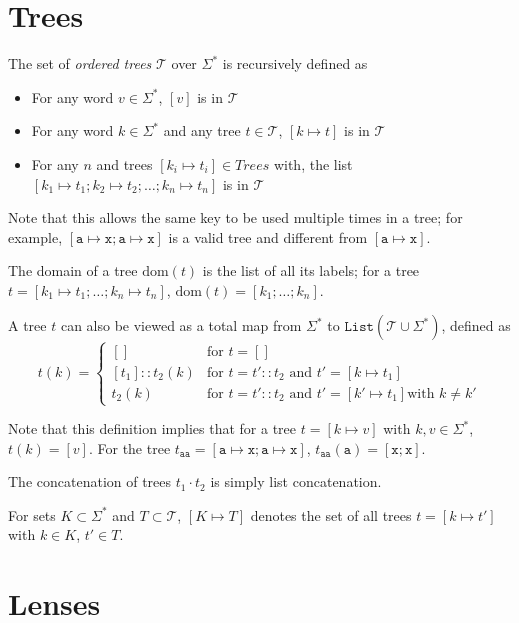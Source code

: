 \documentclass{amsart}
\newcommand{\ensmath}[1]{\ensuremath{#1}\xspace}
\newcommand{\tree}[1]{\ensmath{[#1]}}
\newcommand{\conc}[2]{\ensmath{#1\cdot #2}}
\newcommand{\Trees}{\ensmath{\mathcal T}}
\newcommand{\Words}{\ensmath{\Sigma^*}}
\newcommand{\tmap}[2]{\ensmath{#1\mapsto #2}}
\newcommand{\tmaptt}[2]{\ensmath{{\mathtt #1}\mapsto {\mathtt #2}}}
\newcommand{\dom}[1]{\ensmath{\mathrm{dom}(#1)}}
\newcommand{\List}{\ensmath{\mathtt{List}}}
\begin{document}
\section{Trees}
The set of \emph{ordered trees} \Trees over $\Words$ is recursively 
defined as
\begin{itemize}
\item For any word $v\in\Words$, $\tree{v}$ is in \Trees
\item For any word $k\in\Words$ and any tree $t\in\Trees$,
  $\tree{\tmap{k}{t}}$ is in \Trees
\item For any $n$ and trees $\tree{\tmap{k_i}{t_i}} \in Trees$ with, the
  list $[\tmap{k_1}{t_1};\tmap{k_2}{t_2};\ldots;\tmap{k_n}{t_n}]$ is in
  \Trees
\end{itemize}

Note that this allows the same key to be used multiple times in a tree; for
example, $[\tmaptt{a}{x}; \tmaptt{a}{x}]$ is a valid tree and
different from $[\tmaptt{a}{x}]$.

The domain of a tree $\dom{t}$ is the list of all its labels; for a tree $t
= \tree{\tmap{k_1}{t_1};\ldots;\tmap{k_n}{t_n}}$, $\dom{t} =
[k_1;\ldots;k_n].$

A tree $t$ can also be viewed as a total map from \Words to $\List(\Trees\cup\Words)$,
defined as
\begin{equation*}
  t(k) = 
  \begin{cases}
    [] & \text{for } t = []\\
    [t_1] :: t_2(k) & \text{for } t = t' :: t_2 
                      \text{ and } t' = \tree{\tmap{k}{t_1}}\\
    t_2(k) & \text{for } t = t' :: t_2 
             \text{ and } t' = \tree{\tmap{k'}{t_1}} \text{with } k\neq k'
  \end{cases}
\end{equation*}

Note that this definition implies that for a tree $t = \tree{\tmap{k}{v}}$
with $k,v\in\Words$, $t(k)=[v].$ For the tree $t_{\mathtt{aa}} = [\tmaptt{a}{x};
  \tmaptt{a}{x}]$, $t_{\mathtt{aa}}(\mathtt a) = [\mathtt x; \mathtt x]$.

The concatenation of trees $\conc{t_1}{t_2}$ is simply list concatenation.

For sets $K\subset\Words$ and $T\subset\Trees$, $\tree{\tmap{K}{T}}$
denotes the set of all trees $t = \tree{\tmap{k}{t'}}$ with $k\in K$, $t'
\in T$.

\section{Lenses}
\end{document}
